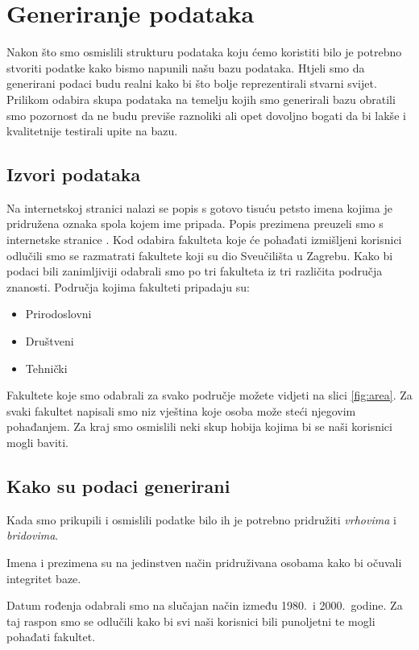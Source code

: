 \documentclass[titlepage, 12pt]{scrartcl}
\begin{document}
	\section{Generiranje podataka}
	Nakon što smo osmislili strukturu podataka koju ćemo koristiti bilo je potrebno stvoriti podatke kako bismo napunili našu bazu podataka. Htjeli smo da generirani podaci budu realni kako bi što bolje reprezentirali stvarni svijet. Prilikom odabira skupa podataka na temelju kojih smo generirali bazu obratili smo pozornost da ne budu previše raznoliki ali opet dovoljno bogati da bi lakše i kvalitetnije testirali upite na bazu.
	\subsection{Izvori podataka}
	Na internetskoj stranici \cite{imena} nalazi se popis s gotovo tisuću petsto imena kojima je pridružena oznaka spola kojem ime pripada. Popis prezimena preuzeli smo s internetske stranice \cite{prezimena}.
	Kod odabira fakulteta koje će pohađati izmišljeni korisnici odlučili smo se razmatrati fakultete koji su dio Sveučilišta u Zagrebu. Kako bi podaci bili zanimljiviji odabrali smo po tri fakulteta iz tri različita područja znanosti. Područja kojima fakulteti pripadaju su:
	\begin{itemize}
		\item Prirodoslovni
		\item Društveni
		\item Tehnički
	\end{itemize}
	Fakultete koje smo odabrali za svako područje možete vidjeti na slici \ref{fig:area}.
	Za svaki fakultet napisali smo niz vještina koje osoba može steći njegovim pohađanjem.
	Za kraj smo osmislili neki skup hobija kojima bi se naši korisnici mogli baviti.
	\subsection{Kako su podaci generirani}
	Kada smo prikupili i osmislili podatke bilo ih je potrebno pridružiti \emph{vrhovima} i \emph{bridovima}.
	
	Imena i prezimena su na jedinstven način pridruživana osobama kako bi očuvali integritet baze.
	
	Datum rođenja odabrali smo na slučajan način između 1980.\ i 2000.\ godine. Za taj raspon smo se odlučili kako bi svi naši korisnici bili punoljetni te mogli pohađati fakultet.
	
\end{document}
